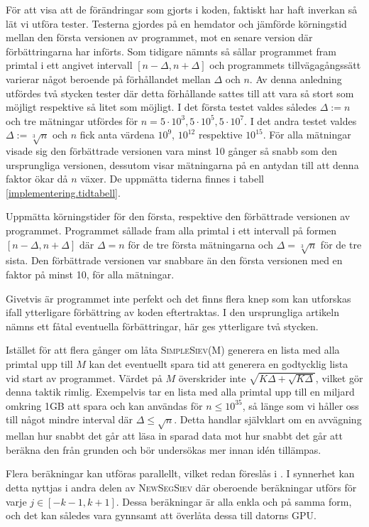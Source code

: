 För att visa att de förändringar som gjorts i koden, faktiskt har haft inverkan så lät vi utföra tester.
Testerna gjordes på en hemdator och jämförde körningstid mellan den första versionen av programmet, mot en senare version där förbättringarna har införts.
Som tidigare nämnts så sållar programmet fram primtal i ett angivet intervall $[n-\Delta,n+\Delta]$ och 
programmets tillvägagångssätt varierar något beroende på förhållandet mellan $\Delta$ och $n$.
Av denna anledning utfördes två stycken tester där detta förhållande sattes till att vara så stort som möjligt respektive så litet som möjligt.
I det första testet valdes således $\Delta:=n$ och tre mätningar utfördes för $n=5\cdot10^3,5\cdot10^5,5\cdot10^7$.
I det andra testet valdes $\Delta:=\sqrt[3]{n}$ och $n$ fick anta värdena $10^9$, $10^{12}$ respektive $10^{15}$.
För alla mätningar visade sig den förbättrade versionen vara minst 10 gånger så snabb som den ursprungliga versionen, dessutom visar mätningarna på en antydan till att denna faktor ökar då $n$ växer. De uppmätta tiderna finnes i tabell \ref{implementering.tidtabell}.

\begin{table}[H]
\centering
\caption{
Uppmätta körningstider för den första, respektive den förbättrade versionen av programmet.
Programmet sållade fram alla primtal i ett intervall på formen $[n-\Delta,n+\Delta]$ där $\Delta=n$ för de tre första mätningarna och $\Delta=\sqrt[3]{n}$ för de tre sista.
Den förbättrade versionen var snabbare än den första versionen med en faktor på minst 10, för alla mätningar.}

\label{implementering.tidtabell}
\end{table}


Givetvis är programmet inte perfekt och det finns flera knep som kan utforskas ifall ytterligare förbättring av koden eftertraktas.
I den ursprungliga artikeln \cite{HaraldSieve} nämns ett fåtal eventuella förbättringar, här ges ytterligare två stycken.
\begin{myitemize}
    \item
    Istället för att flera gånger om låta \textsc{SimpleSiev(M)} generera en lista med alla primtal upp till $M$ kan det eventuellt spara tid att generera en godtycklig lista vid start av programmet.
    Värdet på $M$ överskrider inte $\sqrt{K\Delta+\sqrt{K\Delta}}$, vilket gör denna taktik rimlig.
    Exempelvis tar en lista med alla primtal upp till en miljard omkring 1GB att spara och kan användas för $n\leq 10^{35}$, så länge som vi håller oss till något mindre interval där $\Delta\leq\sqrt{n}$.
    Detta handlar självklart om en avvägning mellan hur snabbt det går att läsa in sparad data mot hur snabbt det går att beräkna den från grunden och bör undersökas mer innan idén tillämpas.
    \item
    Flera beräkningar kan utföras parallellt, vilket redan föreslås i \cite{HaraldSieve}. 
    I synnerhet kan detta nyttjas i andra delen av \textsc{NewSegSiev} där oberoende beräkningar utförs för varje $j\in[-k-1,k+1]$.
    Dessa beräkningar är alla enkla och på samma form, och det kan således vara gynnsamt att överlåta dessa till datorns GPU.
\end{myitemize}

